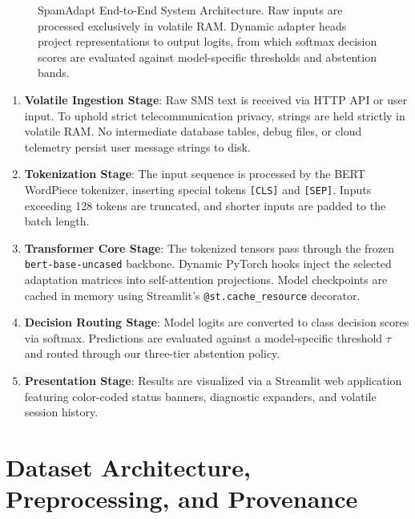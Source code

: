 \documentclass[conference]{IEEEtran}
\begin{document}
\begin{figure}[t]
\caption{SpamAdapt End-to-End System Architecture. Raw inputs are processed exclusively in volatile RAM. Dynamic adapter heads project representations to output logits, from which softmax decision scores are evaluated against model-specific thresholds and abstention bands.}
\label{fig:architecture}
\end{figure}

\begin{enumerate}
    \item \textbf{Volatile Ingestion Stage}: Raw SMS text is received via HTTP API or user input. To uphold strict telecommunication privacy, strings are held strictly in volatile RAM. No intermediate database tables, debug files, or cloud telemetry persist user message strings to disk.
    \item \textbf{Tokenization Stage}: The input sequence is processed by the BERT WordPiece tokenizer, inserting special tokens \texttt{[CLS]} and \texttt{[SEP]}. Inputs exceeding 128 tokens are truncated, and shorter inputs are padded to the batch length.
    \item \textbf{Transformer Core Stage}: The tokenized tensors pass through the frozen \texttt{bert-base-uncased} backbone. Dynamic PyTorch hooks inject the selected adaptation matrices into self-attention projections. Model checkpoints are cached in memory using Streamlit's \texttt{@st.cache\_resource} decorator.
    \item \textbf{Decision Routing Stage}: Model logits are converted to class decision scores via softmax. Predictions are evaluated against a model-specific threshold $\tau$ and routed through our three-tier abstention policy.
    \item \textbf{Presentation Stage}: Results are visualized via a Streamlit web application featuring color-coded status banners, diagnostic expanders, and volatile session history.
\end{enumerate}

\section{Dataset Architecture, Preprocessing, and Provenance}
\label{sec:dataset}
\end{document}
